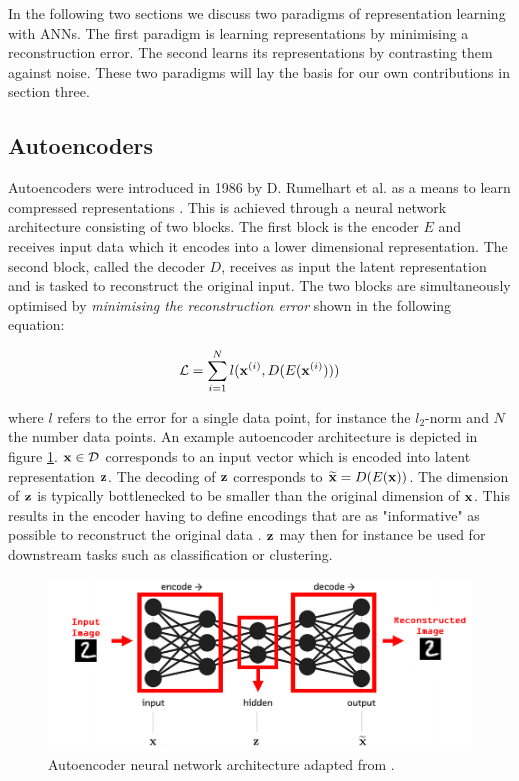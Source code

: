 In the following two sections we discuss two paradigms of representation learning with ANNs. The first paradigm is learning representations by minimising a reconstruction error. The second learns its representations by contrasting them against noise. These two paradigms will lay the basis for our own contributions in section three.

\subsection{Autoencoders}
Autoencoders were introduced in 1986 by D. Rumelhart et al. \cite{rumelhartLearningInternalRepresentations1988} as a means to learn compressed representations \cite{bankAutoencoders2021}. This is achieved through a neural network architecture consisting of two blocks. The first block is the encoder $E$ and receives input data which it encodes into a lower dimensional representation. The second block, called the decoder $D$, receives as input the latent representation and is tasked to reconstruct the original input. The two blocks are simultaneously optimised by \textit{minimising the reconstruction error} shown in the following equation:

\begin{equation}
	\mathcal{L} = \sum_{i = 1}^N l(\mathbf{x}^{(i)}, D(E(\mathbf{x}^{(i)})))
\end{equation}

where $l$ refers to the error for a single data point, for instance the $l_2$-norm and $N$ the number data points. An example autoencoder architecture is depicted in figure \ref{fig:autoencoder}. $\mathbf{x} \in \mathcal{D}$ corresponds to an input vector which is encoded into latent representation $\mathbf{z}$. The decoding of $\mathbf{z}$ corresponds to $\widetilde{\mathbf{x}} = D(E(\mathbf{x}))$. The dimension of $\mathbf{z}$ is typically bottlenecked to be smaller than the original dimension of $\mathbf{x}$. This results in the encoder having to define encodings that are as "informative" as possible to reconstruct the original data \cite{bankAutoencoders2021}. $\mathbf{z}$ may then for instance be used for downstream tasks such as classification or clustering.

\begin{figure}
	\centering
	\includegraphics[width=0.7\linewidth]{autoencoder}
	\caption{Autoencoder neural network architecture adapted from \cite{karagiannakosHowGenerateImages2018}.}
	\label{fig:autoencoder}
\end{figure}


